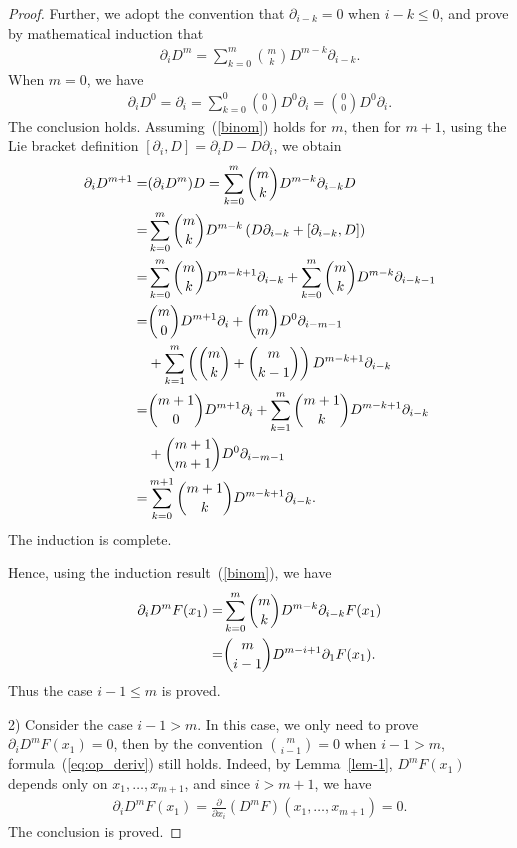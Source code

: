 \documentclass[11pt]{article}
\begin{document}
\begin{proof}
	Further, we adopt the convention that $\partial_{i-k}=0$ when $i-k\leq 0$, and prove by mathematical induction that
	\begin{align}
		\partial_iD^m=\sum_{k=0}^m\binom{m}{k}D^{m-k}\partial_{i-k}.\label{binom}
	\end{align}
	When $m=0$, we have
	\begin{align}
		\partial_iD^0=\partial_i=\sum_{k=0}^0\binom{0}{0}D^0\partial_i=\binom{0}{0}D^0\partial_i.
	\end{align}
	The conclusion holds. Assuming~(\ref{binom}) holds for $m$, then for $m+1$, using the Lie bracket definition $[\partial_i,D]=\partial_i D-D\partial_i$, we obtain
	\begin{align}
		\partial_iD^{m+1}=&(\partial_i D^m)D=\sum_{k=0}^m\binom{m}{k}D^{m-k}\partial_{i-k}D\notag\\
		=&\sum_{k=0}^m\binom{m}{k}D^{m-k}\left(D\partial_{i-k}+[\partial_{i-k},D]\right)\notag\\
		=&\sum_{k=0}^m\binom{m}{k}D^{m-k+1}\partial_{i-k}+\sum_{k=0}^m\binom{m}{k}D^{m-k}\partial_{i-k-1}\notag\\
		=&\binom{m}{0}D^{m+1}\partial_i+\binom{m}{m}D^0\partial_{i-m-1}\notag\\
		&+\sum_{k=1}^m\left(\binom{m}{k}+\binom{m}{k-1}\right)D^{m-k+1}\partial_{i-k}\notag\\
		=&\binom{m+1}{0}D^{m+1}\partial_i+\sum_{k=1}^m\binom{m+1}{k}D^{m-k+1}\partial_{i-k}\notag\\
		&+\binom{m+1}{m+1}D^0\partial_{i-m-1}\notag\\
		=&\sum_{k=0}^{m+1}\binom{m+1}{k}D^{m-k+1}\partial_{i-k}.
	\end{align}
	The induction is complete.
	
	Hence, using the induction result~(\ref{binom}), we have
	\begin{align}
		\partial_iD^mF(x_1)=&\sum_{k=0}^m\binom{m}{k}D^{m-k}\partial_{i-k}F(x_1)\notag\\
		=&\binom{m}{i-1}D^{m-i+1}\partial_1 F(x_1).
	\end{align}
	Thus the case $i-1\leq m$ is proved.
	
	2) Consider the case $i-1>m$. In this case, we only need to prove $\partial_i D^m F(x_1)=0$, then by the convention $\binom{m}{i-1}=0$ when $i-1>m$, formula~(\ref{eq:op_deriv}) still holds. Indeed, by Lemma~\ref{lem-1}, $D^mF(x_1)$ depends only on $x_1,\ldots,x_{m+1}$, and since $i>m+1$, we have
	\begin{align}
		\partial_i D^m F(x_1)=\frac{\partial}{\partial x_{i}}(D^mF)(x_1,\ldots,x_{m+1})=0.
	\end{align}
	The conclusion is proved.
\end{proof}
\end{document}
